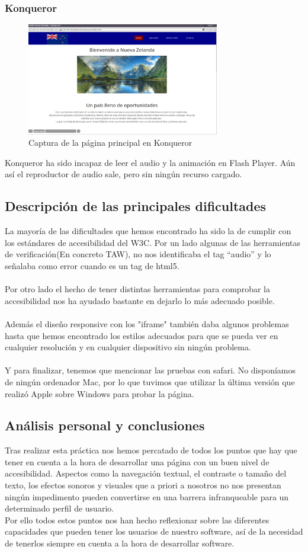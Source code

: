 \subsubsection{Konqueror}
\begin{figure}[h]
	\centering
	\includegraphics[width=0.75\textwidth]{./Fotos/konqueror-capture.png}
	\caption{Captura de la página principal en Konqueror}
	\label{fig: ejemplo}
\end{figure}
Konqueror ha sido incapaz de leer el audio y la animación en Flash Player. Aún así el reproductor de audio sale, pero sin ningún recurso cargado.
\subsection{Descripción de las principales dificultades}
La mayoría de las dificultades que hemos encontrado ha sido la de cumplir con los estándares de accesibilidad del W3C. Por un lado algunas de las herramientas de verificación(En concreto TAW), no nos identificaba el tag ``audio'' y lo señalaba como error cuando es un tag de html5. \\ \\
Por otro lado el hecho de tener distintas herramientas para comprobar la accesibilidad nos ha ayudado bastante en dejarlo lo más adecuado posible. \\ \\
Además el diseño responsive con los "iframe" también daba algunos problemas hasta que hemos encontrado los estilos adecuados para que se pueda ver en cualquier resolución y en cualquier dispositivo sin ningún problema.
\\ \\Y para finalizar, tenemos que mencionar las pruebas con safari. No disponíamos de ningún ordenador Mac, por lo que tuvimos que utilizar la última versión que realizó Apple sobre Windows para probar la página.
\subsection{Análisis personal y conclusiones}
Tras realizar esta práctica nos hemos percatado de todos los puntos que hay que tener en cuenta a la hora de desarrollar una página con un buen nivel de accesibilidad. Aspectos como la navegación textual, el contraste o tamaño del texto, los efectos sonoros y visuales que a priori a nosotros no nos presentan ningún impedimento pueden convertirse en una barrera infranqueable para un determinado perfil de usuario.\\
Por ello todos estos puntos nos han hecho reflexionar sobre las diferentes capacidades que pueden tener los usuarios de nuestro software, así de la necesidad de tenerlos siempre en cuenta a la hora de desarrollar software.